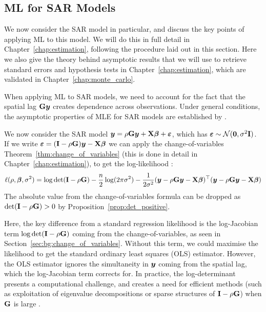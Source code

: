 \subsection{ML for SAR Models}

We now consider the SAR model in particular, and discuss the key points of applying ML to this model. We will do this in full detail in Chapter~\ref{chap:estimation}, following the procedure laid out in this section. Here we also give the theory behind asymptotic results that we will use to retrieve standard errors and hypothesis tests in Chapter~\ref{chap:estimation}, which are validated in Chapter~\ref{chap:monte_carlo}.

When applying ML to SAR models, we need to account for the fact that the spatial lag $\mathbf{G}\bm{y}$ creates dependence across observations. Under general conditions, the asymptotic properties of MLE for SAR models are established by \textcite[Thm.~3.2, p.~1906]{Lee2004}.

We now consider the SAR model $\bm{y} = \rho\mathbf{G}\bm{y} + \mathbf{X}\bm{\beta} + \bm{\varepsilon}$, which has $\bm{\varepsilon} \sim \mathcal{N}(\bm{0}, \sigma^2\mathbf{I})$. If we write $\bm{\varepsilon} = (\mathbf{I} - \rho\mathbf{G})\bm{y} - \mathbf{X}\bm{\beta}$ we can apply the change-of-variables Theorem~\ref{thm:change_of_variables} (this is done in detail in Chapter~\ref{chap:estimation}), to get the log-likelihood \parencite[Sec.~3.1.1, pp.~47--48]{LeSage2009}:
\begin{equation}
\label{eq:sar_loglik}
    \ell(\rho, \bm{\beta}, \sigma^2) = \log\det(\mathbf{I} - \rho\mathbf{G}) - \frac{n}{2}\log(2\pi\sigma^2) - \frac{1}{2\sigma^2}(\bm{y} - \rho\mathbf{G}\bm{y} - \mathbf{X}\bm{\beta})^\top(\bm{y} - \rho\mathbf{G}\bm{y} - \mathbf{X}\bm{\beta})
\end{equation}
The absolute value from the change-of-variables formula can be dropped as $\det(\mathbf{I} - \rho\mathbf{G}) > 0$ by Proposition~\ref{prop:det_positive}.

Here, the key difference from a standard regression likelihood is the log-Jacobian term $\log\det(\mathbf{I} - \rho\mathbf{G})$ coming from the change-of-variables, as seen in Section~\ref{sec:bg:change_of_variables}. Without this term, we could maximise the likelihood to get the standard ordinary least squares (OLS) estimator. However, the OLS estimator ignores the simultaneity in $\bm{y}$ coming from the spatial lag, which the log-Jacobian term corrects for. In practice, the log-determinant presents a computational challenge, and creates a need for efficient methods (such as exploitation of eigenvalue decompositions or sparse structures of $\mathbf{I} - \rho\mathbf{G}$) when $\mathbf{G}$ is large \parencite[pp.~237--241]{Pace1997}.

